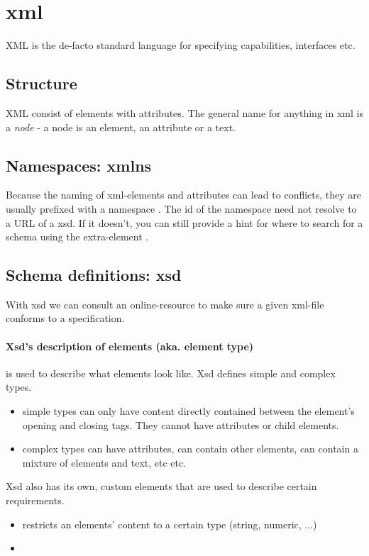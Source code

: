\section{xml}

XML is the de-facto standard language for specifying capabilities, interfaces etc.

\subsection{Structure}
XML consist of elements with attributes. The general name for anything in xml is a \emph{node} - a node is an element, an attribute or a text. 

\subsection{Namespaces: xmlns}
Because the naming of xml-elements and attributes can lead to conflicts, they are usually prefixed with a namespace . The id of the namespace need not resolve to a URL of a xsd. If it doesn't, you can still provide a hint for where to search for a schema using the extra-element . 

\subsection{Schema definitions: xsd}
With xsd we can consult an online-resource to make sure a given xml-file conforms to a specification.

\paragraph{Xsd's description of elements (aka. element type)} is used to describe what elements look like. 
Xsd defines simple and complex types. 
\begin{itemize}
    \item {} simple types can only have content directly contained between the element’s opening and closing tags. They cannot have attributes or child elements.
    \item {} complex types can have attributes, can contain other elements, can contain a mixture of elements and text, etc etc.
\end{itemize}
Xsd also has its own, custom elements that are used to describe certain requirements.
\begin{itemize}
    \item {} restricts an elements' content to a certain type (string, numeric, ...)
    \item {}
\end{itemize} 

